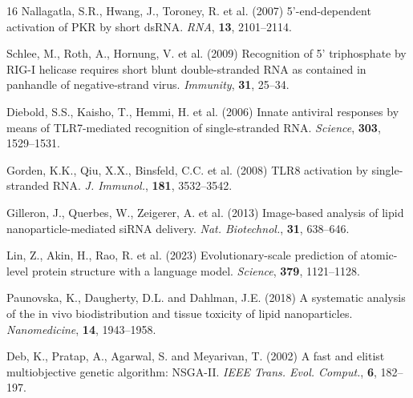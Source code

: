 \documentclass{article}
\begin{document}
\begin{thebibliography}{16}
Nallagatla, S.R., Hwang, J., Toroney, R. et al. (2007)
5'-end-dependent activation of PKR by short dsRNA.
\textit{RNA}, \textbf{13}, 2101--2114.

Schlee, M., Roth, A., Hornung, V. et al. (2009)
Recognition of 5' triphosphate by RIG-I helicase requires short blunt double-stranded RNA as contained in panhandle of negative-strand virus.
\textit{Immunity}, \textbf{31}, 25--34.

Diebold, S.S., Kaisho, T., Hemmi, H. et al. (2006)
Innate antiviral responses by means of TLR7-mediated recognition of single-stranded RNA.
\textit{Science}, \textbf{303}, 1529--1531.

Gorden, K.K., Qiu, X.X., Binsfeld, C.C. et al. (2008)
TLR8 activation by single-stranded RNA.
\textit{J. Immunol.}, \textbf{181}, 3532--3542.

Gilleron, J., Querbes, W., Zeigerer, A. et al. (2013)
Image-based analysis of lipid nanoparticle-mediated siRNA delivery.
\textit{Nat. Biotechnol.}, \textbf{31}, 638--646.

Lin, Z., Akin, H., Rao, R. et al. (2023)
Evolutionary-scale prediction of atomic-level protein structure with a language model.
\textit{Science}, \textbf{379}, 1121--1128.

Paunovska, K., Daugherty, D.L. and Dahlman, J.E. (2018)
A systematic analysis of the in vivo biodistribution and tissue toxicity of lipid nanoparticles.
\textit{Nanomedicine}, \textbf{14}, 1943--1958.

Deb, K., Pratap, A., Agarwal, S. and Meyarivan, T. (2002)
A fast and elitist multiobjective genetic algorithm: NSGA-II.
\textit{IEEE Trans. Evol. Comput.}, \textbf{6}, 182--197.

\end{thebibliography}
\end{document}
